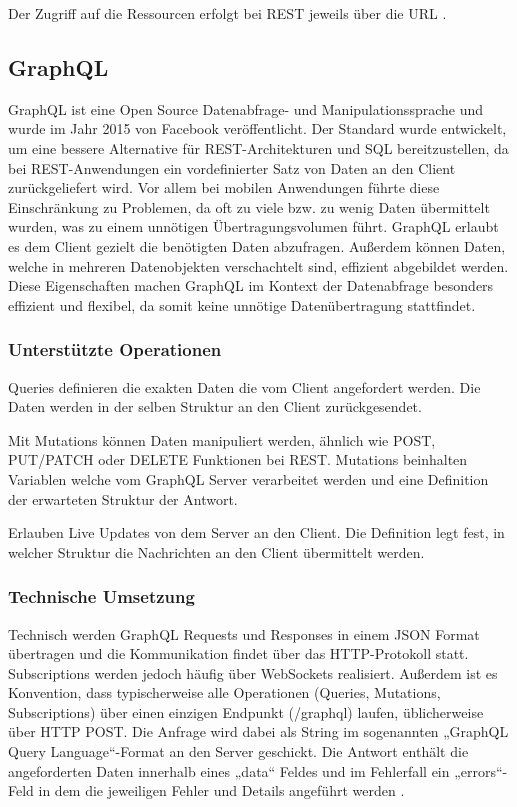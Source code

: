 Der Zugriff auf die Ressourcen erfolgt bei REST jeweils über die URL \parencite{rfc9110}.


\subsection{GraphQL}
GraphQL ist eine Open Source Datenabfrage- und Manipulationssprache und wurde im Jahr 2015 von Facebook veröffentlicht.
Der Standard wurde entwickelt, um eine bessere Alternative für REST-Architekturen und SQL bereitzustellen, da bei REST-Anwendungen ein vordefinierter Satz von Daten an den Client  zurückgeliefert wird. Vor allem bei mobilen Anwendungen führte diese Einschränkung zu Problemen, da oft zu viele bzw. zu wenig Daten übermittelt wurden, was zu einem unnötigen Übertragungsvolumen führt.
GraphQL erlaubt es dem Client gezielt die benötigten Daten abzufragen. Außerdem können Daten, welche in mehreren Datenobjekten verschachtelt sind, effizient abgebildet werden. Diese Eigenschaften machen GraphQL im Kontext der Datenabfrage besonders effizient und flexibel, da somit keine unnötige Datenübertragung stattfindet. 

\subsubsection*{Unterstützte Operationen}

\begin{description}[leftmargin=2cm, style=nextline]
	\item[Queries (schreibend):]  
	Queries definieren die exakten Daten die vom Client angefordert werden. Die Daten werden in der selben Struktur an den Client zurückgesendet. 
	
	\item[Mutations (manipulierend): ]  
	Mit Mutations können Daten manipuliert werden, ähnlich wie POST, PUT/PATCH oder DELETE Funktionen bei REST. Mutations beinhalten Variablen welche vom GraphQL Server verarbeitet werden und eine Definition der erwarteten Struktur der Antwort.
	
	\item[Subscriptions:]  
	Erlauben Live Updates von dem Server an den Client. Die Definition legt fest, in welcher Struktur die Nachrichten an den Client übermittelt werden.
\end{description}

\subsubsection*{Technische Umsetzung}
Technisch werden GraphQL Requests und Responses in einem JSON Format übertragen und die Kommunikation findet über das HTTP-Protokoll statt. Subscriptions werden jedoch häufig über WebSockets realisiert. Außerdem ist es Konvention, dass typischerweise alle Operationen (Queries, Mutations, Subscriptions) über einen einzigen Endpunkt (/graphql) laufen, üblicherweise über HTTP POST. 
Die Anfrage wird dabei als String im sogenannten „GraphQL Query Language“-Format an den Server geschickt. Die Antwort enthält die angeforderten Daten innerhalb eines „data“ Feldes und im Fehlerfall ein „errors“-Feld in dem die jeweiligen Fehler und Details angeführt werden \parencite{graphql-org}.


